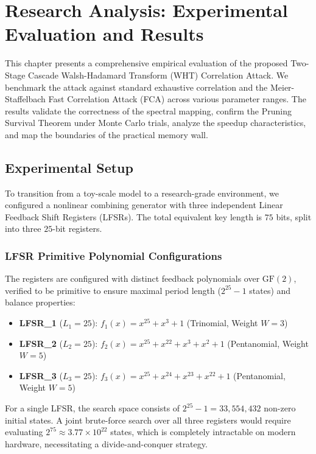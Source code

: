\chapter{Research Analysis: Experimental Evaluation and Results}
\label{ch:results}

This chapter presents a comprehensive empirical evaluation of the proposed Two-Stage Cascade Walsh-Hadamard Transform (WHT) Correlation Attack. We benchmark the attack against standard exhaustive correlation and the Meier-Staffelbach Fast Correlation Attack (FCA) across various parameter ranges. The results validate the correctness of the spectral mapping, confirm the Pruning Survival Theorem under Monte Carlo trials, analyze the speedup characteristics, and map the boundaries of the practical memory wall.

\section{Experimental Setup}
\label{sec:experimental_setup}

To transition from a toy-scale model to a research-grade environment, we configured a nonlinear combining generator with three independent Linear Feedback Shift Registers (LFSRs). The total equivalent key length is $75$ bits, split into three $25$-bit registers. 

\subsection{LFSR Primitive Polynomial Configurations}
The registers are configured with distinct feedback polynomials over $\text{GF}(2)$, verified to be primitive to ensure maximal period length ($2^{25} - 1$ states) and balance properties:
\begin{itemize}
    \item \textbf{LFSR\_1} ($L_1 = 25$): $f_1(x) = x^{25} + x^3 + 1$ (Trinomial, Weight $W = 3$)
    \item \textbf{LFSR\_2} ($L_2 = 25$): $f_2(x) = x^{25} + x^{22} + x^3 + x^2 + 1$ (Pentanomial, Weight $W = 5$)
    \item \textbf{LFSR\_3} ($L_3 = 25$): $f_3(x) = x^{25} + x^{24} + x^{23} + x^{22} + 1$ (Pentanomial, Weight $W = 5$)
\end{itemize}
For a single LFSR, the search space consists of $2^{25} - 1 = 33,554,432$ non-zero initial states. A joint brute-force search over all three registers would require evaluating $2^{75} \approx 3.77 \times 10^{22}$ states, which is completely intractable on modern hardware, necessitating a divide-and-conquer strategy.

